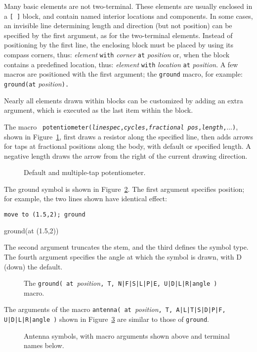 \label{Other}
Many basic elements are not two-terminal.  These elements are usually enclosed
in a \verb|[ ]| block, and contain named interior locations and components.
In some cases, an
invisible line determining length and direction (but not position) can
be specified by the first argument, as for the two-terminal elements.
Instead of positioning by the first line, the enclosing block must be
placed by using its compass corners, thus:
  {\sl element} {\tt with} {\sl corner} {\tt at} {\sl position} 
or, when the block contains a predefined location, thus:
  {\sl element} {\tt with} {\sl location} {\tt at} {\sl position}.
A few macros are positioned with the first argument;
the {\tt ground} macro, for example:
  {\tt ground(}{\tt at} {\sl position}{\tt ).} 

Nearly all elements drawn within blocks can be customized by adding an
extra argument, which is executed as the last item within the block.

The macro {\tt
   potentiometer({\sl linespec},{\sl cycles},{\sl fractional pos},{\sl length},$
    \ldots$)},
shown in Figure~\ref{Potentiometers},
first draws a resistor along the specified line, then adds arrows for taps
at fractional positions along the body, with default or specified length.
A negative length draws the arrow from the right of the current drawing
direction.
\begin{figure}[ht!]
   
   \caption{Default and multiple-tap potentiometer.}
   \label{Potentiometers}
   \end{figure}

The ground symbol is shown in Figure~\ref{Grounds}.
The first argument specifies position; for example, the two lines shown
have identical effect:

{\tt move to (1.5,2); ground

ground(at (1.5,2)) }

\noindent The second argument truncates
the stem, and the third defines the symbol type.
The fourth argument specifies the angle at which the symbol is drawn,
with D (down) the default.
\begin{figure}[ht!]
   
   \caption{The 
     {\tt ground( at }{\sl position}{\tt, T, N|F|S|L|P|E, U|D|L|R|angle )}
     macro.}
   \label{Grounds}
   \end{figure}

The arguments of the macro
{\tt antenna( at }{\sl position}{\tt, T, A|L|T|S|D|P|F, U|D|L|R|angle )}\break
shown in Figure~\ref{Antennas} are similar to those of {\tt ground}.
\enlargethispage{\baselineskip}
\begin{figure}[h!t]
   
   \caption{Antenna symbols, with macro arguments shown above and
     terminal names below.}
   \label{Antennas}
   \end{figure}

